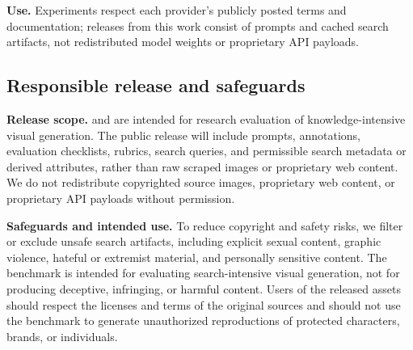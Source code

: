 \textbf{Use.}
Experiments respect each provider's publicly posted terms and documentation; releases from this work consist of prompts and cached search artifacts, not redistributed model weights or proprietary API payloads.

\subsection{Responsible release and safeguards}
\label{app:responsible_release}

\textbf{Release scope.}
\dataset{} and \bench{} are intended for research evaluation of knowledge-intensive visual generation.
The public release will include prompts, annotations, evaluation checklists, rubrics, search queries, and permissible search metadata or derived attributes, rather than raw scraped images or proprietary web content.
We do not redistribute copyrighted source images, proprietary web content, or proprietary API payloads without permission.

\textbf{Safeguards and intended use.}
To reduce copyright and safety risks, we filter or exclude unsafe search artifacts, including explicit sexual content, graphic violence, hateful or extremist material, and personally sensitive content.
The benchmark is intended for evaluating search-intensive visual generation, not for producing deceptive, infringing, or harmful content.
Users of the released assets should respect the licenses and terms of the original sources and should not use the benchmark to generate unauthorized reproductions of protected characters, brands, or individuals.
